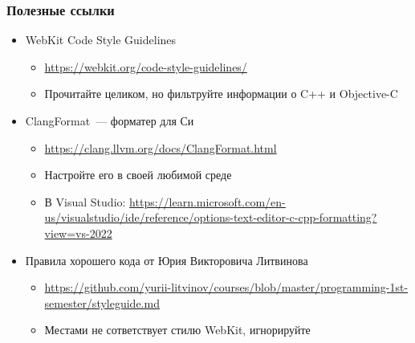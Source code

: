 \documentclass[aspectratio=169]{beamer}
\begin{document}
\begin{frame}
    \frametitle{Полезные ссылки}

    \begin{itemize}
        \item WebKit Code Style Guidelines
              \begin{itemize}
                  \item \url{https://webkit.org/code-style-guidelines/}
                  \item Прочитайте целиком, но фильтруйте информации о C++ и Objective-C
              \end{itemize}
        \item ClangFormat~--- форматер для Си
              \begin{itemize}
                  \item \url{https://clang.llvm.org/docs/ClangFormat.html}
                  \item Настройте его в своей любимой среде
                  \item В Visual Studio: \url{https://learn.microsoft.com/en-us/visualstudio/ide/reference/options-text-editor-c-cpp-formatting?view=vs-2022}
              \end{itemize}
        \item Правила хорошего кода от Юрия Викторовича Литвинова
              \begin{itemize}
                  \item \url{https://github.com/yurii-litvinov/courses/blob/master/programming-1st-semester/styleguide.md}
                  \item Местами не сответствует стилю WebKit, игнорируйте
              \end{itemize}
    \end{itemize}

\end{frame}
\end{document}
